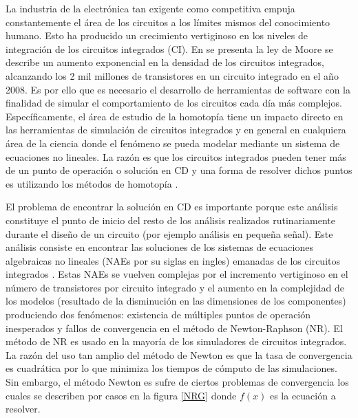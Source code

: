 \documentclass[conference,letterpaper,onecolumn]{IEEEtran}
\begin{document}
La industria de la electr\'onica tan exigente como competitiva empuja constantemente el \'area de los circuitos a los l{\'i}mites mismos del conocimiento humano. Esto ha producido un crecimiento vertiginoso en los niveles de integraci\'on de los circuitos integrados (CI). En \cite{lmoore}  se presenta la ley de Moore se describe un aumento exponencial en la densidad de los circuitos integrados, alcanzando los 2 mil millones de transistores en un circuito integrado en el a\~no 2008. Es por ello que es necesario el desarrollo de herramientas de software con la finalidad de simular el comportamiento de los circuitos cada d{\'i}a m\'as complejos. Espec{\'i}ficamente, el \'area de estudio de la homotop{\'i}a tiene un impacto directo en las herramientas de simulaci\'on de circuitos integrados y en general en cualquiera \'area de la ciencia donde el fen\'omeno se pueda modelar mediante un sistema de ecuaciones no lineales. La raz\'on es que los circuitos integrados pueden tener m\'as de un punto de operaci\'on o soluci\'on en CD y  una forma de resolver dichos puntos es utilizando los m\'etodos de homotop{\'i}a \cite{homo_ogrodzki}.


El problema de encontrar la soluci\'on en CD es importante porque este an\'alisis constituye el punto de inicio del resto de los an\'alisis realizados rutinariamente durante el dise\~no de un circuito (por ejemplo an\'alisis en peque\~na se\~nal). Este an\'alisis consiste en encontrar las soluciones de los sistemas de ecuaciones algebraicas no lineales (NAEs por su siglas en ingles) emanadas de los circuitos integrados \cite{Schwa_book,mnaxx}. Estas NAEs se vuelven complejas por el incremento vertiginoso en el n\'umero de transistores por circuito integrado  y el aumento en la complejidad de los modelos (resultado de la disminuci\'on en las dimensiones de los componentes) produciendo dos fen\'omenos: existencia de m\'ultiples puntos de operaci\'on inesperados 
y fallos de convergencia en el m\'etodo de Newton-Raphson (NR).
El m\'etodo de NR es usado en la mayor{\'i}a de los simuladores de circuitos integrados.  La raz\'on del uso tan amplio del m\'etodo de Newton es que la tasa de convergencia es cuadr\'atica \cite{Schwa_book} por lo que minimiza los tiempos de c\'omputo de las simulaciones. Sin embargo, el m\'etodo Newton es sufre de ciertos problemas de convergencia \cite{cont_quasi,Schwa_book} los cuales se describen por casos en la figura \ref{NRG} donde $f(x)$ es la ecuaci\'on a resolver.
\end{document}
